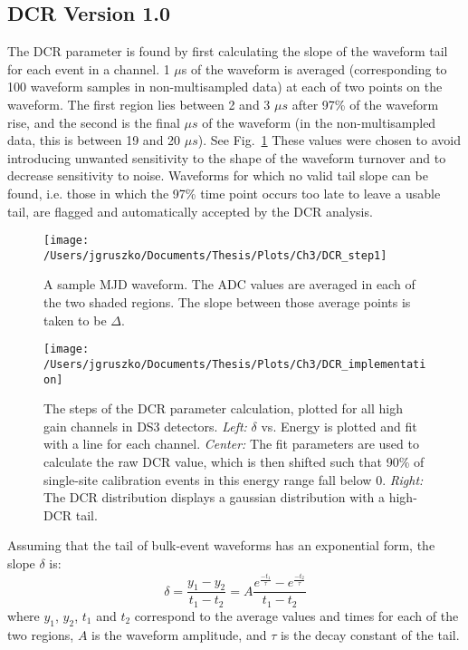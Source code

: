 \subsection{DCR Version 1.0}
The DCR parameter is found by first calculating the slope of the waveform tail for each event in a channel. 1 $\mu$s of the waveform is averaged (corresponding to 100 waveform samples in non-multisampled data) at each of two points on the waveform. The first region lies between 2 and 3 $\mu s$ after 97\% of the waveform rise, and the second is the final $\mu s$ of the waveform (in the non-multisampled data, this is between 19 and 20 $\mu s$). See Fig.~\ref{fig:DCR_step1} These values were chosen to avoid introducing unwanted sensitivity to the shape of the waveform turnover and to decrease sensitivity to noise. Waveforms for which no valid tail slope can be found, i.e. those in which the 97\% time point occurs too late to leave a usable tail, are flagged and automatically accepted by the DCR analysis. 

\begin{figure}[h]
 \centering
 \texttt{[image: /Users/jgruszko/Documents/Thesis/Plots/Ch3/DCR\_step1]}
 \caption[A sample MJD waveform, with indicated tail slope measurement points]{A sample MJD waveform. The ADC values are averaged in each of the two shaded regions. The slope between those average points is taken to be $\Delta$.} 
 \label{fig:DCR_step1}
\end{figure}

\begin{figure*}[t]
 \centering
 \texttt{[image: /Users/jgruszko/Documents/Thesis/Plots/Ch3/DCR\_implementation]}
 \caption[The steps of the DCR parameter calculation]{The steps of the DCR parameter calculation, plotted for all high gain channels in DS3 detectors. {\it Left:} $\delta$ vs. Energy is plotted and fit with a line for each channel. {\it Center:} The fit parameters are used to calculate the raw DCR value, which is then shifted such that 90\% of single-site calibration events in this energy range fall below 0. {\it Right:} The DCR distribution displays a gaussian distribution with a high-DCR tail.} 
 \label{fig:DCR_implementation}
\end{figure*}

Assuming that the tail of bulk-event waveforms has an exponential form, the slope $\delta$ is:
$$\delta = \frac{y_1 - y_2}{t_1-t_2} = A\frac{e^{\frac{-t_1}{\tau}}-e^{\frac{-t_2}{\tau}}}{t_1-t_2} $$
where $y_1$, $y_2$, $t_1$ and $t_2$ correspond to the average values and times for each of the two regions, $A$ is the waveform amplitude, and $\tau$ is the decay constant of the tail. 

